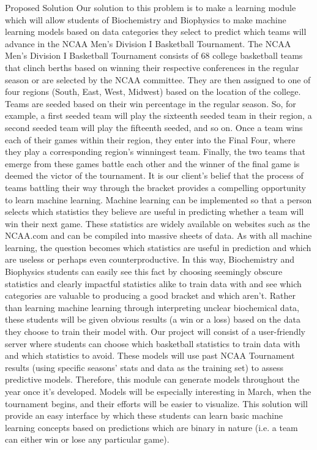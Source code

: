 \documentclass[letterpaper,20pt,titlepage]{article}
\begin{document}
\begin{section}{Proposed Solution}
Our solution to this problem is to make a learning module which will allow students of Biochemistry and Biophysics to make machine learning models based on data categories they select to predict which teams will advance in the NCAA Men’s Division I Basketball Tournament. The NCAA Men’s Division I Basketball Tournament consists of 68 college basketball teams that clinch berths based on winning their respective conferences in the regular season or are selected by the NCAA committee. They are then assigned to one of four regions (South, East, West, Midwest) based on the location of the college. Teams are seeded based on their win percentage in the regular season. So, for example, a first seeded team will play the sixteenth seeded team in their region, a second seeded team will play the fifteenth seeded, and so on. Once a team wins each of their games within their region, they enter into the Final Four, where they play a corresponding region’s winningest team. Finally, the two teams that emerge from these games battle each other and the winner of the final game is deemed the victor of the tournament. It is our client’s belief that the process of teams battling their way through the bracket provides a compelling opportunity to learn machine learning. Machine learning can be implemented so that a person selects which statistics they believe are useful in predicting whether a team will win their next game. These statistics are widely available on websites such as the NCAA.com and can be compiled into massive sheets of data. As with all machine learning, the question becomes which statistics are useful in prediction and which are useless or perhaps even counterproductive. In this way, Biochemistry and Biophysics students can easily see this fact by choosing seemingly obscure statistics and clearly impactful statistics alike to train data with and see which categories are valuable to producing a good bracket and which aren’t. Rather than learning machine learning through interpreting unclear biochemical data, these students will be given obvious results (a win or a loss) based on the data they choose to train their model with. Our project will consist of a user-friendly server where students can choose which basketball statistics to train data with and which statistics to avoid. These models will use past NCAA Tournament results (using specific seasons' stats and data as the training set) to assess predictive models. Therefore, this module can generate models throughout the year once it's developed. Models will be especially interesting in March, when the tournament begins, and their efforts will be easier to visualize. This solution will provide an easy interface by which these students can learn basic machine learning concepts based on predictions which are binary in nature (i.e. a team can either win or lose any particular game).
\end{section}
\end{document}
